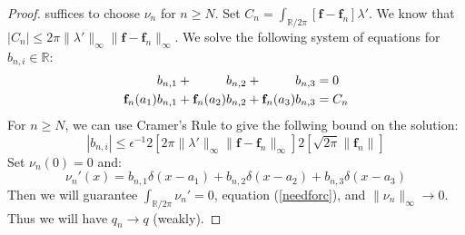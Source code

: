 \documentclass{amsart}
\newcommand{\R}			{\mathbb R}
\newcommand{\f}			{\mathbf f}
\numberwithin{equation}{section}
\begin{document}
\begin{proof}
suffices to choose $\nu_n$ for $n\geq N$.  Set 
$C_n=\int_{\R/2\pi}[\f-\f_n]\lambda'$.  We know that 
$|C_n|\leq 2\pi\|\lambda'\|_\infty\|\f-\f_n\|_\infty$.  We solve 
the following system of equations for $b_{n,i}\in\R$:
\begin{align}
\hphantom{\f_n(a_1)}b_{n,1}+\hphantom{\f_n(a_2)}b_{n,2}+\hphantom{\f_n(a_3)}b_{n,3}&=0\\
\f_n(a_1)b_{n,1}+\f_n(a_2)b_{n,2}+\f_n(a_3)b_{n,3}&=C_n
\end{align}
For $n\geq N$, we can use Cramer's Rule to give the follwing 
bound on the solution:
\begin{equation}
|b_{n,i}|\leq\epsilon^{-1}2[2\pi\|\lambda'\|_\infty\|\f-\f_n\|_\infty]2[\sqrt{2\pi}\|\f_n\|]
\end{equation}
Set $\nu_n(0)=0$ and:
\begin{equation}
\nu_n'(x)=b_{n,1}\delta(x-a_1)+b_{n,2}\delta(x-a_2)+b_{n,3}\delta(x-a_3)
\end{equation}
Then we will guarantee $\int_{\R/2\pi}\nu_n'=0$, equation 
(\ref{needforc}), and $\|\nu_n\|_\infty\to 0$.  Thus we 
will have $q_n\to q$ (weakly).
\end{proof}
\end{document}
